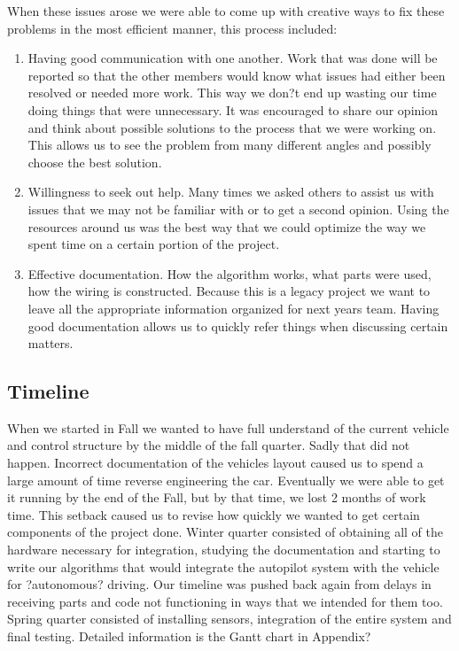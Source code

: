 When these issues arose we were able to come up with creative ways to fix these problems in the most efficient manner, this process included:

\begin{enumerate}
\item Having good communication with one another.  Work that was done will be reported so that the other members would know what issues had either been resolved or needed more work. This way we don?t end up wasting our time doing things that were unnecessary.   It was encouraged to share our opinion and think about possible solutions to the process that we were working on.  This allows us to see the problem from many different angles and possibly choose the best solution.
\item Willingness to seek out help.  Many times we asked others to assist us with issues that we may not be familiar with or to get a second opinion.  Using the resources around us was the best way that we could optimize the way we spent time on a certain portion of the project.
\item Effective documentation.  How the algorithm works, what parts were used, how the wiring is constructed.  Because this is a legacy project we want to leave all the appropriate information organized for next years team.  Having good documentation allows us to quickly refer things when discussing certain matters.
\end{enumerate}
		
		
\subsection{Timeline}
		
When we started in Fall we wanted to have full understand of the current vehicle and control structure by the middle of the fall quarter.  Sadly that did not happen.  Incorrect documentation of the vehicles layout caused us to spend a large amount of time reverse engineering the car.  Eventually we were able to get it running by the end of the Fall, but by that time, we lost 2 months of work time.  This setback caused us to revise how quickly we wanted to get certain components of the project done. Winter quarter consisted of obtaining all of the hardware necessary for integration, studying the documentation and starting to write our algorithms that would integrate the autopilot system with the vehicle for ?autonomous? driving.  Our timeline was pushed back again from delays in receiving parts and code not functioning in ways that we intended for them too.  Spring quarter consisted of installing sensors, integration of the entire system and final testing.  Detailed information is the Gantt chart in Appendix?
		
